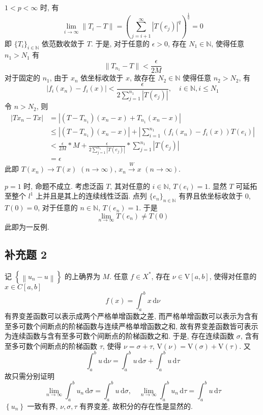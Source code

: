 \documentclass[../main.tex]{subfiles}
\begin{document}
$1 < p < \infty$ 时, 有
\[
    \lim_{i \to \infty} \| T_i - T \|
    = \left( \sum_{j = i + 1}^{\infty} \left| T \left( e_j \right) \right|^q \right)^{\frac{1}{q}}
    = 0
\]
即 $\{ T_{i} \}_{i \in \mathbb{N}}$ 依范数收敛于 $T$.
于是, 对于任意的 $\epsilon > 0$, 存在 $N_1 \in \mathbb{N}$, 使得任意 $n_1 > N_1$ 有
\[
    \| T_{n_1} - T \| < \frac{\epsilon}{2 M}
\]
对于固定的 $n_1$, 由于 $x_n$ 依坐标收敛于 $x$, 故存在 $N_2 \in \mathbb{N}$ 使得任意 $n_2 > N_2$, 有
\[
    \left| f_i \left( x_n \right) - f_i \left( x \right) \right|
    < \frac{\epsilon}{2 \sum_{j = 1}^{n_1} \left| T \left( e_j \right) \right|},
    \quad i \in \mathbb{N}, i \leqslant N_1
\]
令 $n > N_2$, 则
\begin{align*}
    \left| T x_n - T x \right|
    &= \left|
        \left( T - T_{n_1} \right) \left( x_n - x \right) + T_{n_1} \left( x_n - x \right)
    \right| \\
    &\leqslant \left|
        \left( T - T_{n_1} \right) \left( x_n - x \right)
    \right|
    + \left|
        \sum_{i = 1}^{n_1} \left( f_i \left( x_n \right) - f_i \left( x \right)  \right) T \left( e_i \right)
    \right| \\
    &< \frac{\epsilon}{2 M} * M
        + \frac{\epsilon}{2 \sum_{j = 1}^{n_1} \left| T \left( e_j \right) \right|} * \sum_{j = 1}^{n_1} \left| T \left( e_j \right) \right| \\
    &= \epsilon
\end{align*}
此即 $T \left( x_n \right) \to T \left( x \right) $ $(n \to \infty)$, $x_n \xrightarrow{W} x$ $(n \to \infty)$.

$p = 1$ 时, 命题不成立.
考虑泛函 $T$, 其对任意的 $i \in \mathbb{N}$, $T \left( e_i \right) = 1$.
显然 $T$ 可延拓至整个 $l^1$ 上并且是其上的连续线性泛函.
点列 $\{ e_{n} \}_{n \in \mathbb{N}}$ 有界且依坐标收敛于 $0$,
$T \left( 0 \right) = 0$, 对于任意的 $n \in \mathbb{N}$, $T \left( e_n \right) = 1$.
于是
\[
    \lim_{n \to \infty} T \left( e_n \right) \neq T \left( 0 \right)
\]
此即为一反例.

\subsection{补充题 2}
记 $\left\{ \left\| u_n - u \right\| \right\}$ 的上确界为 $M$.
任意 $f \in X^*$, 存在 $\nu \in \mathrm{V} [a, b]$, 使得对任意的 $x \in C[a, b]$
\[
    f \left( x \right) = \int_{a}^{b} x \, \mathrm{d} \nu
\]
有界变差函数可以表示成两个严格单增函数之差,
而严格单增函数可以表示为含有至多可数个间断点的阶梯函数与连续严格单增函数之和,
故有界变差函数皆可表示为连续函数与含有至多可数个间断点的阶梯函数之和.
于是, 存在连续函数 $\sigma$, 含有至多可数个间断点的阶梯函数 $\tau$,
使得 $\nu = \sigma + \tau$, $\mathrm{V} \left( \nu \right) = \mathrm{V} \left( \sigma \right) + \mathrm{V} \left( \tau \right)$.
又
\[
    \int_{a}^{b} u \, \mathrm{d} \nu
    = \int_{a}^{b} u \, \mathrm{d} \sigma + \int_{a}^{b} u \, \mathrm{d} \tau
\]
故只需分别证明
\[
    \lim_{n \to \infty} \int_{a}^{b} u_n \, \mathrm{d} \sigma = \int_{a}^{b} u \, \mathrm{d} \sigma
    , \quad
    \lim_{n \to \infty} \int_{a}^{b} u_n \, \mathrm{d} \tau = \int_{a}^{b} u \, \mathrm{d} \tau
\]
$\left\{ u_n \right\}$ 一致有界, $\nu, \sigma, \tau$ 有界变差, 故积分的存在性是显然的.
\end{document}
